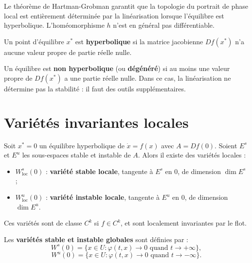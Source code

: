 \begin{remarque}
Le th\'eor\`eme de Hartman-Grobman garantit que la topologie du portrait de
phase local est enti\`erement d\'etermin\'ee par la lin\'earisation lorsque
l'\'equilibre est hyperbolique. L'hom\'eomorphisme $h$ n'est en g\'en\'eral
pas diff\'erentiable.
\end{remarque}

\begin{definition}
Un point d'\'equilibre $x^*$ est \textbf{hyperbolique} si la matrice
jacobienne $Df(x^*)$ n'a aucune valeur propre de partie r\'eelle nulle.
\end{definition}

\begin{definition}
Un \'equilibre est \textbf{non hyperbolique} (ou \textbf{d\'eg\'en\'er\'e})
si au moins une valeur propre de $Df(x^*)$ a une partie r\'eelle nulle.
Dans ce cas, la lin\'earisation ne d\'etermine pas la stabilit\'e : il faut
des outils suppl\'ementaires.
\end{definition}

\section{Vari\'et\'es invariantes locales}

\begin{theoreme}
\label{thm:varietes-stables}
Soit $x^* = 0$ un \'equilibre hyperbolique de $\dot{x} = f(x)$ avec
$A = Df(0)$. Soient $E^s$ et $E^u$ les sous-espaces stable et instable de
$A$. Alors il existe des vari\'et\'es locales :
\begin{itemize}
    \item $W^s_{\mathrm{loc}}(0)$ : \textbf{vari\'et\'e stable locale},
    tangente \`a $E^s$ en $0$, de dimension $\dim E^s$ ;
    \item $W^u_{\mathrm{loc}}(0)$ : \textbf{vari\'et\'e instable locale},
    tangente \`a $E^u$ en $0$, de dimension $\dim E^u$.
\end{itemize}
Ces vari\'et\'es sont de classe $C^k$ si $f \in C^k$, et sont localement
invariantes par le flot.
\end{theoreme}

\begin{definition}
Les \textbf{vari\'et\'es stable et instable globales} sont d\'efinies par :
\[
    W^s(0) = \{x \in U : \varphi(t, x) \to 0 \text{ quand } t \to +\infty\},
\]
\[
    W^u(0) = \{x \in U : \varphi(t, x) \to 0 \text{ quand } t \to -\infty\}.
\]
\end{definition}

